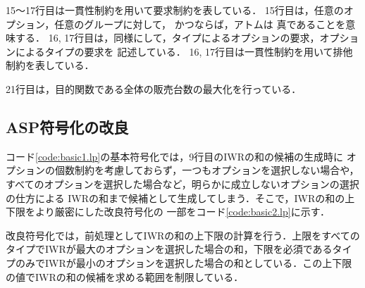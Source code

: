 15〜17行目は一貫性制約を用いて要求制約を表している．
15行目は，任意のオプション，任意のグループに対して，
かつならば，アトムは
真であることを意味する．
16, 17行目は，同様にして，タイプによるオプションの要求，オプションによるタイプの要求を
記述している．
16, 17行目は一貫性制約を用いて排他制約を表している．


21行目は，目的関数である全体の販売台数の最大化を行っている．




\subsection{ASP符号化の改良}
 

コード\ref{code:basic1.lp}の基本符号化では，9行目のIWRの和の候補の生成時に
オプションの個数制約を考慮しておらず，一つもオプションを選択しない場合や，
すべてのオプションを選択した場合など，明らかに成立しないオプションの選択の仕方による
IWRの和まで候補として生成してしまう．そこで，IWRの和の上下限をより厳密にした改良符号化の
一部をコード\ref{code:basic2.lp}に示す．

改良符号化では，前処理としてIWRの和の上下限の計算を行う．上限をすべてのタイプでIWRが最大のオプションを選択した場合の和，下限を必須であるタイプのみでIWRが最小のオプションを選択した場合の和としている．この上下限の値でIWRの和の候補を求める範囲を制限している．
